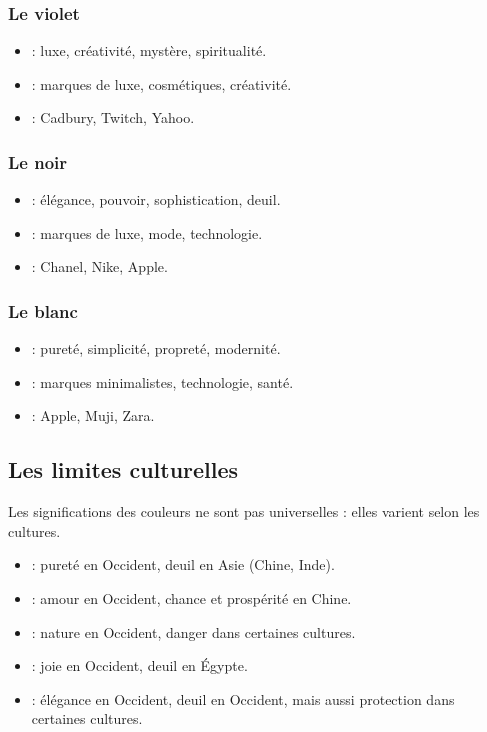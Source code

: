 \subsubsection{Le violet}

\begin{itemize}
    \item {} : luxe, créativité, mystère, spiritualité.
    \item {} : marques de luxe, cosmétiques, créativité.
    \item {} : Cadbury, Twitch, Yahoo.
\end{itemize}

\subsubsection{Le noir}

\begin{itemize}
    \item {} : élégance, pouvoir, sophistication, deuil.
    \item {} : marques de luxe, mode, technologie.
    \item {} : Chanel, Nike, Apple.
\end{itemize}

\subsubsection{Le blanc}

\begin{itemize}
    \item {} : pureté, simplicité, propreté, modernité.
    \item {} : marques minimalistes, technologie, santé.
    \item {} : Apple, Muji, Zara.
\end{itemize}

\subsection{Les limites culturelles}

Les significations des couleurs ne sont pas universelles : elles varient selon les cultures.

\begin{itemize}
    \item {} : pureté en Occident, deuil en Asie (Chine, Inde).
    \item {} : amour en Occident, chance et prospérité en Chine.
    \item {} : nature en Occident, danger dans certaines cultures.
    \item {} : joie en Occident, deuil en Égypte.
    \item {} : élégance en Occident, deuil en Occident, mais aussi protection dans certaines cultures.
\end{itemize}

